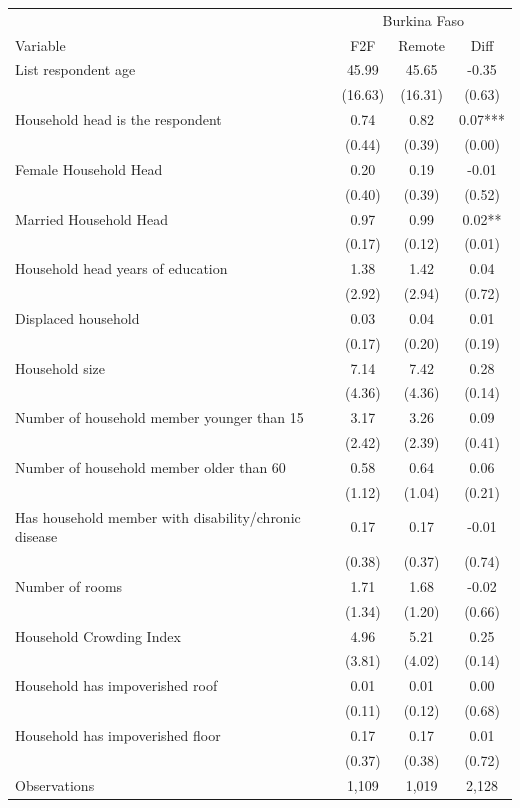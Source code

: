 \begin{tabular}{l*{3}c}
\hline\hline
 & \multicolumn{3}{c}{Burkina Faso}\\ 
Variable & F2F & Remote & Diff \\
\hline
List respondent age&45.99&45.65&-0.35\\
&(16.63)&(16.31)&(0.63)\\
Household head is the respondent&0.74&0.82&0.07***\\
&(0.44)&(0.39)&(0.00)\\
Female Household Head&0.20&0.19&-0.01\\
&(0.40)&(0.39)&(0.52)\\
Married Household Head&0.97&0.99&0.02**\\
&(0.17)&(0.12)&(0.01)\\
Household head years of education&1.38&1.42&0.04\\
&(2.92)&(2.94)&(0.72)\\
Displaced household&0.03&0.04&0.01\\
&(0.17)&(0.20)&(0.19)\\
Household size&7.14&7.42&0.28\\
&(4.36)&(4.36)&(0.14)\\
Number of household member younger than 15&3.17&3.26&0.09\\
&(2.42)&(2.39)&(0.41)\\
Number of household member older than 60&0.58&0.64&0.06\\
&(1.12)&(1.04)&(0.21)\\
Has household member with disability/chronic disease&0.17&0.17&-0.01\\
&(0.38)&(0.37)&(0.74)\\
Number of rooms&1.71&1.68&-0.02\\
&(1.34)&(1.20)&(0.66)\\
Household Crowding Index&4.96&5.21&0.25\\
&(3.81)&(4.02)&(0.14)\\
Household has impoverished roof&0.01&0.01&0.00\\
&(0.11)&(0.12)&(0.68)\\
Household has impoverished floor&0.17&0.17&0.01\\
&(0.37)&(0.38)&(0.72)\\
\hline
Observations & 1,109 & 1,019 & 2,128 \\
\hline\hline
\end{tabular}

